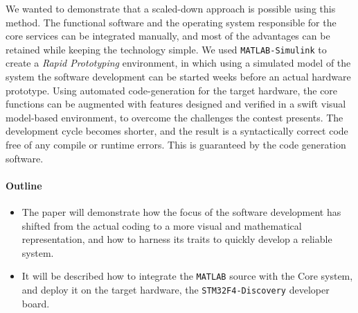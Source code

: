 
We wanted to demonstrate that a scaled-down approach is possible using this method. The functional software and the operating system responsible for the core services can be integrated manually, and most of the advantages can be retained while keeping the technology simple. We used \verb!MATLAB-Simulink! to create a \emph{Rapid Prototyping} environment, in which using a simulated model of the system the software development can be started weeks before an actual hardware prototype. Using automated code-generation for the target hardware, the core functions can be augmented with features designed and verified in a swift visual model-based environment, to overcome the challenges the contest presents. The development cycle becomes shorter, and the result is a syntactically correct code free of any compile or runtime errors. This is guaranteed by the code generation software.

\paragraph{Outline}
\begin{itemize}
\item The paper will demonstrate how the focus of the software development has shifted from the actual coding to a more visual and mathematical representation, and how to harness its traits to quickly develop a reliable system.
\item It will be described how to integrate the \texttt{MATLAB} source with the Core system, and deploy it on the target hardware, the \verb!STM32F4-Discovery! developer board.
\end{itemize}